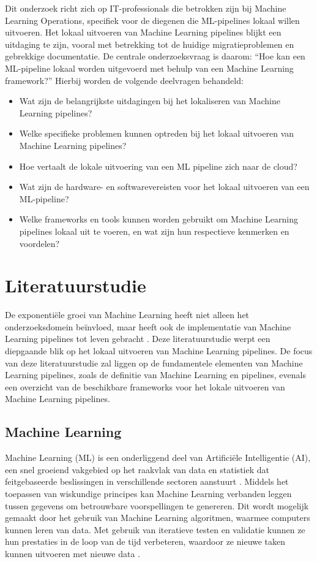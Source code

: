 Dit onderzoek richt zich op IT-professionals die betrokken zijn bij Machine Learning Operations, specifiek voor de diegenen die ML-pipelines lokaal willen uitvoeren.
Het lokaal uitvoeren van Machine Learning pipelines blijkt een uitdaging te zijn, vooral met betrekking tot de huidige migratieproblemen en gebrekkige documentatie.
De centrale onderzoeksvraag is daarom: ``Hoe kan een ML-pipeline lokaal worden uitgevoerd met behulp van een Machine Learning framework?''
Hierbij worden de volgende deelvragen behandeld:
\begin{itemize}
  \item Wat zijn de belangrijkste uitdagingen bij het lokaliseren van Machine Learning pipelines?
  \item Welke specifieke problemen kunnen optreden bij het lokaal uitvoeren van Machine \-Learning pipelines?
  \item Hoe vertaalt de lokale uitvoering van een ML pipeline zich naar de cloud?
  \item Wat zijn de hardware- en softwarevereisten voor het lokaal uitvoeren van een ML-pipeline?
  \item Welke frameworks en tools kunnen worden gebruikt om Machine Learning pipelines lokaal uit te voeren, en wat zijn hun respectieve kenmerken en voordelen?
\end{itemize}



\section{Literatuurstudie}%
\label{sec:state-of-the-art}
De exponentiële groei van Machine Learning heeft niet alleen het onderzoeksdomein beïnvloed, maar heeft ook de implementatie van Machine Learning pipelines tot leven gebracht \autocite{Aggarwal2022}.
Deze literatuurstudie werpt een diepgaande blik op het lokaal uitvoeren van Machine Learning pipelines.
De focus van deze literatuurstudie zal liggen op de fundamentele elementen van Machine Learning pipelines, zoals de definitie van Machine Learning en pipelines, evenals een overzicht van de beschikbare frameworks voor het lokale uitvoeren van Machine Learning pipelines.
\subsection{Machine Learning}
Machine Learning (ML) is een onderliggend deel van Artificiële Intelligentie (AI), een snel groeiend vakgebied op het raakvlak van data en statistiek dat feitgebaseerde beslissingen in verschillende sectoren aanstuurt \autocite{Jordan2015}.
Middels het toepassen van wiskundige principes kan Machine Learning verbanden leggen tussen gegevens om betrouwbare voorspellingen te genereren. Dit wordt mogelijk gemaakt door het gebruik van Machine Learning algoritmen, waarmee computers kunnen leren van data. Met gebruik van iteratieve testen en validatie kunnen ze hun prestaties in de loop van de tijd verbeteren, waardoor ze nieuwe taken kunnen uitvoeren met nieuwe data \autocite{Shaveta2023}.
